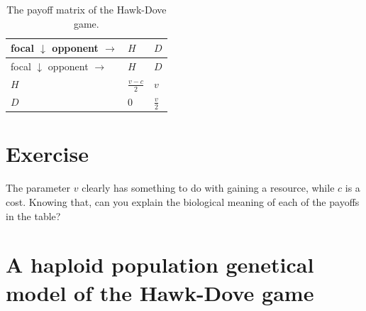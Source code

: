 \documentclass[
]{book}
\begin{document}
\begin{longtable}[]{@{}
  >{\raggedright\arraybackslash}p{}
  >{\raggedright\arraybackslash}p{}
  >{\raggedright\arraybackslash}p{}@{}}
\caption{\label{tab:payoffHD} The payoff matrix of the Hawk-Dove game.}\tabularnewline
\toprule\noalign{}
\begin{minipage}[b]{\linewidth}\raggedright
focal \(\downarrow\) opponent \(\rightarrow\)
\end{minipage} & \begin{minipage}[b]{\linewidth}\raggedright
\(H\)
\end{minipage} & \begin{minipage}[b]{\linewidth}\raggedright
\(D\)
\end{minipage} \\
\midrule\noalign{}
\endfirsthead
\toprule\noalign{}
\begin{minipage}[b]{\linewidth}\raggedright
focal \(\downarrow\) opponent \(\rightarrow\)
\end{minipage} & \begin{minipage}[b]{\linewidth}\raggedright
\(H\)
\end{minipage} & \begin{minipage}[b]{\linewidth}\raggedright
\(D\)
\end{minipage} \\
\midrule\noalign{}
\endhead
\bottomrule\noalign{}
\endlastfoot
\(H\) & \(\frac{v-c}{2}\) & \(v\) \\
\(D\) & \(0\) & \(\frac{v}{2}\) \\
\end{longtable}

\section{Exercise}\label{exercise-1}

The parameter \(v\) clearly has something to do with gaining a resource, while \(c\) is a cost. Knowing that, can you explain the biological meaning of each of the payoffs in the table?

\section{A haploid population genetical model of the Hawk-Dove game}\label{a-haploid-population-genetical-model-of-the-hawk-dove-game}
\end{document}
